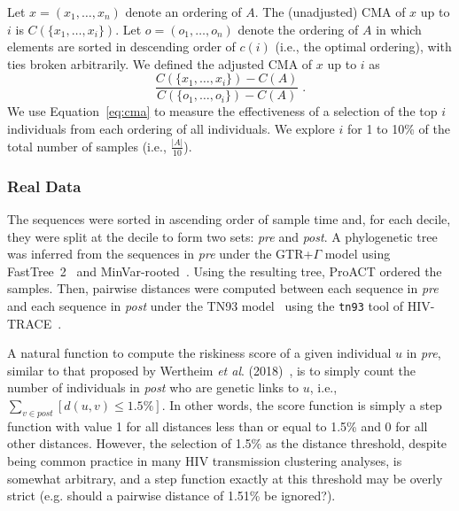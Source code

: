 Let $x=(x_1,\ldots,x_n)$ denote an ordering of $A$. The (unadjusted) \gls{CMA} of $x$ up to $i$ is $C\left(\{x_1,\ldots,x_i\}\right)$. Let $o=(o_1,\ldots,o_n)$ denote the ordering of $A$ in which elements are sorted in descending order of $c(i)$ (i.e., the optimal ordering), with ties broken arbitrarily. We defined the adjusted \gls{CMA} of $x$ up to $i$ as
\begin{equation}\label{eq:cma}
    \frac{C\left(\{x_1,\ldots,x_i\}\right)-C(A)}{C\left(\{o_1,\ldots,o_i\}\right)-C(A)}\; .
\end{equation}
We use Equation~\ref{eq:cma} to measure the effectiveness of a selection of the top $i$ individuals from each ordering of all individuals. We explore $i$ for 1 to 10\% of the total number of samples (i.e., $\frac{|A|}{10}$).

\subsubsection{Real Data}
The sequences were sorted in ascending order of sample time and, for each decile, they were split at the decile to form two sets: \textit{pre} and \textit{post}. A phylogenetic tree was inferred from the sequences in \textit{pre} under the \gls{GTR}+$\Gamma$ model using FastTree~2~\cite{Price2010} and MinVar-rooted~\cite{Mai2017}. Using the resulting tree, ProACT ordered the samples. Then, pairwise distances were computed between each sequence in \textit{pre} and each sequence in \textit{post} under the \gls{TN93} model~\cite{Tamura1993} using the \texttt{tn93} tool of HIV-TRACE~\cite{Pond2018}.

A natural function to compute the riskiness score of a given individual $u$ in \textit{pre}, similar to that proposed by Wertheim \textit{et al}. (2018)~\cite{Wertheim2018}, is to simply count the number of individuals in \textit{post} who are genetic links to $u$, i.e., $\sum_{v\in post}{\left[d(u,v)\le1.5\%\right]}$. In other words, the score function is simply a step function with value 1 for all distances less than or equal to 1.5\% and 0 for all other distances. However, the selection of 1.5\% as the distance threshold, despite being common practice in many \gls{HIV} transmission clustering analyses, is somewhat arbitrary, and a step function exactly at this threshold may be overly strict (e.g. should a pairwise distance of 1.51\% be ignored?).

